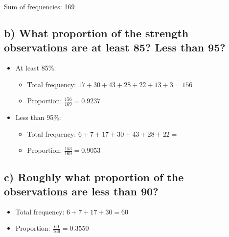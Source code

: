 Sum of frequencies: 169
\subsection{b) What proportion of the strength observations are at
    least 85? Less than 95?}

\begin{itemize}
    \item{At least 85\%:}
          \begin{itemize}
              \item Total frequency: \(17+30+43+28+22+13+3=156\)
              \item Proportion: \(\frac{156}{169}=0.9237\)
          \end{itemize}

    \item{Less than 95\%:}
          \begin{itemize}
              \item Total frequency: \(6+7+17+30+43+28+22=\)
              \item Proportion: \(\frac{153}{169}=0.9053\)
          \end{itemize}
\end{itemize}

\subsection{c) Roughly what proportion of the observations are less
    than 90?}
\begin{itemize}
    \item Total frequency: \(6+7+17+30=60\)
    \item Proportion: \(\frac{60}{169}=0.3550\)
\end{itemize}